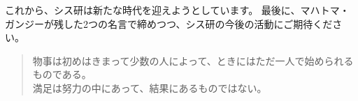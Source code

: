 これから、シス研は新たな時代を迎えようとしています。
最後に、マハトマ・ガンジーが残した2つの名言で締めつつ、シス研の今後の活動にご期待ください。

\begin{quote}
    物事は初めはきまって少数の人によって、ときにはただ一人で始められるものである。
    \\
    満足は努力の中にあって、結果にあるものではない。
\end{quote}
